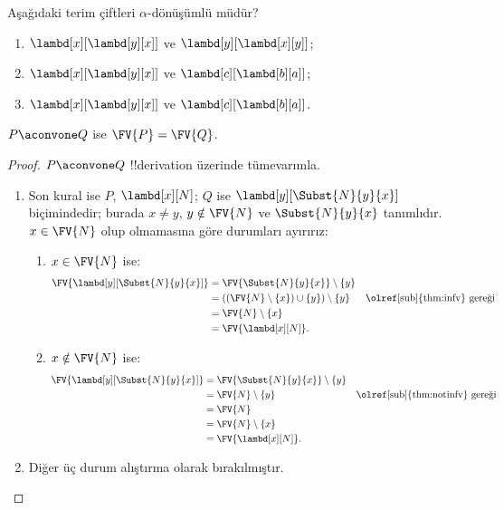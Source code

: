 \documentclass[../../../include/open-logic-section]{subfiles}
\begin{document}
\begin{prob}
  Aşağıdaki terim çiftleri $\alpha$-dönüşümlü müdür?
  \begin{enumerate}
  \item $\lambd[x][\lambd[y][x]]$ ve $\lambd[y][\lambd[x][y]]$;
  \item $\lambd[x][\lambd[y][x]]$ ve $\lambd[c][\lambd[b][a]]$;
  \item $\lambd[x][\lambd[y][x]]$ ve $\lambd[c][\lambd[b][a]]$.
  \end{enumerate}
\end{prob}

\begin{lem}
  $P \aconvone Q$ ise $\FV{P} = \FV{Q}$.
\end{lem}

\begin{proof}
  $P \aconvone Q$ !!{derivation} üzerinde tümevarımla.
  \begin{enumerate}
  \item Son kural  ise $P$, $\lambd[x][N]$;
    $Q$ ise $\lambd[y][\Subst{N}{y}{x}]$ biçimindedir; burada $x\neq y$,
    $y\notin\FV{N}$ ve $\Subst{N}{y}{x}$ tanımlıdır. $x\in\FV{N}$ olup
    olmamasına göre durumları ayırırız:
    \begin{enumerate}
    \item $x \in \FV{N}$ ise:
      \begin{align*}
        \FV{\lambd[y][\Subst{N}{y}{x}]} &=
        \FV{\Subst{N}{y}{x}} \setminus \{y\} \\
        & = ((\FV{N} \setminus \{x\}) \cup \{y\}) \setminus \{y\}
         && \text{\olref[sub]{thm:infv} gereği} \\
        & = \FV{N} \setminus \{x\} \\
        & = \FV{\lambd[x][N]}.
      \end{align*}
    \item $x \notin \FV{N}$ ise:
      \begin{align*}
        \FV{\lambd[y][\Subst{N}{y}{x}]}
        & = \FV{\Subst{N}{y}{x}} \setminus \{y\} \\
        & = \FV{N} \setminus \{y\}
         && \text{\olref[sub]{thm:notinfv} gereği} \\
        & = \FV{N} \\
        & = \FV{N}\setminus\{x\} \\
        & = \FV{\lambd[x][N]}.
      \end{align*}
    \end{enumerate}
  \item Diğer üç durum alıştırma olarak bırakılmıştır.
  \end{enumerate}
\end{proof}
\end{document}
